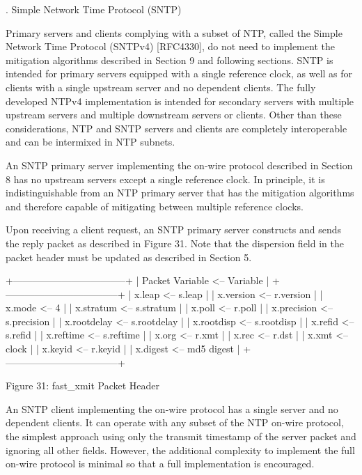 .  Simple Network Time Protocol (SNTP)

   Primary servers and clients complying with a subset of NTP, called
   the Simple Network Time Protocol (SNTPv4) [RFC4330], do not need to
   implement the mitigation algorithms described in Section 9 and
   following sections.  SNTP is intended for primary servers equipped
   with a single reference clock, as well as for clients with a single
   upstream server and no dependent clients.  The fully developed NTPv4
   implementation is intended for secondary servers with multiple
   upstream servers and multiple downstream servers or clients.  Other
   than these considerations, NTP and SNTP servers and clients are
   completely interoperable and can be intermixed in NTP subnets.

   An SNTP primary server implementing the on-wire protocol described in
   Section 8 has no upstream servers except a single reference clock.
   In principle, it is indistinguishable from an NTP primary server that
   has the mitigation algorithms and therefore capable of mitigating
   between multiple reference clocks.

   Upon receiving a client request, an SNTP primary server constructs
   and sends the reply packet as described in Figure 31.  Note that the
   dispersion field in the packet header must be updated as described in
   Section 5.

                   +-----------------------------------+
                   | Packet Variable <--   Variable    |
                   +-----------------------------------+
                   | x.leap        <--     s.leap      |
                   | x.version     <--     r.version   |
                   | x.mode        <--     4           |
                   | x.stratum     <--     s.stratum   |
                   | x.poll        <--     r.poll      |
                   | x.precision   <--     s.precision |
                   | x.rootdelay   <--     s.rootdelay |
                   | x.rootdisp    <--     s.rootdisp  |
                   | x.refid       <--     s.refid     |
                   | x.reftime     <--     s.reftime   |
                   | x.org         <--     r.xmt       |
                   | x.rec         <--     r.dst       |
                   | x.xmt         <--     clock       |
                   | x.keyid       <--     r.keyid     |
                   | x.digest      <--     md5 digest  |
                   +-----------------------------------+

                    Figure 31: fast_xmit Packet Header

   An SNTP client implementing the on-wire protocol has a single server
   and no dependent clients.  It can operate with any subset of the NTP
   on-wire protocol, the simplest approach using only the transmit
   timestamp of the server packet and ignoring all other fields.
   However, the additional complexity to implement the full on-wire
   protocol is minimal so that a full implementation is encouraged.
